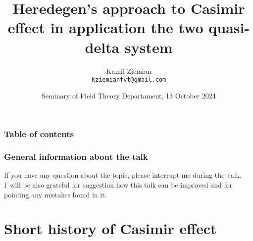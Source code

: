 \documentclass[10pt,t]{beamer}
\title{Heredegen's approach to Casimir effect in application the
  two quasi-delta system}
\author{Kamil Ziemian \\
  \texttt{kziemianfvt@gmail.com}}
\date[13 X 2024]{Seminary of Field Theory Departament,
  13 October 2024}
\begin{document}





\RaggedRight





\maketitle





\begin{frame}
  \frametitle{Table of contents}


  \tableofcontents %

\end{frame}












\begin{frame}
  \frametitle{General information about the talk}


  If you have any question about the topic, please interrupt me during
  the~talk. I~will be also grateful for suggestion how this talk can be
  improved and for pointing any mistakes found in it.

\end{frame}










\section{Short history of Casimir effect}
\end{document}
